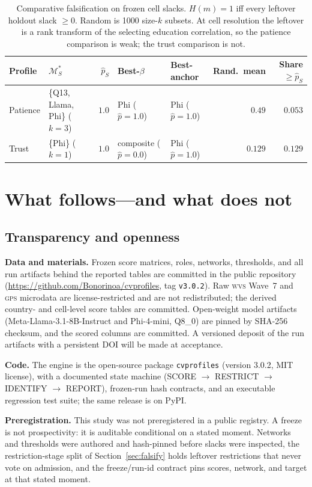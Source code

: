 \documentclass[10pt,letterpaper]{article}
\newcommand{\GPS}{\textsc{gps}}
\newcommand{\WVS}{\textsc{wvs}}
\newcommand{\cvp}{\texttt{cvprofiles}}
\newcommand{\M}{\ensuremath{\mathcal{M}}}
\begin{document}
\begin{table}[ht]
\centering
\small
\caption{Comparative falsification on frozen cell slacks.
$H(m)=1$ iff every leftover holdout slack $\ge 0$.
Random is 1000 size-$k$ subsets.
At cell resolution the leftover is a rank transform of the selecting education correlation, so the patience comparison is weak; the trust comparison is not.}
\label{tab:falsify}
\begin{tabular}{@{}l l r l l r r@{}}
\toprule
Profile & $\M^*_S$ & $\hat p_S$ & Best-$\beta$ & Best-anchor & Rand.\ mean & Share $\ge\hat p_S$ \\
\midrule
Patience & \{Q13, Llama, Phi\} ($k{=}3$) & $1.0$ & Phi ($\hat p{=}1.0$) & Phi ($\hat p{=}1.0$) & $0.49$ & $0.053$ \\
Trust & \{Phi\} ($k{=}1$) & $1.0$ & composite ($\hat p{=}0.0$) & Phi ($\hat p{=}1.0$) & $0.129$ & $0.129$ \\
\bottomrule
\end{tabular}
\end{table}

\section{What follows---and what does not}
\label{sec:discussion}

\subsection{Transparency and openness}
\label{sec:transparency}
\textbf{Data and materials.}
Frozen score matrices, roles, networks, thresholds, and all run artifacts behind the reported tables are committed in the public repository (\url{https://github.com/Bonorinoa/cvprofiles}, tag \texttt{v3.0.2}).
Raw \WVS{} Wave~7 and \GPS{} microdata are license-restricted and are not redistributed; the derived country- and cell-level score tables are committed.
Open-weight model artifacts (Meta-Llama-3.1-8B-Instruct and Phi-4-mini, Q8\_0) are pinned by SHA-256 checksum, and the scored columns are committed.
A versioned deposit of the run artifacts with a persistent DOI will be made at acceptance.

\textbf{Code.}
The engine is the open-source package \cvp{} (version 3.0.2, MIT license), with a documented state machine (SCORE $\to$ RESTRICT $\to$ IDENTIFY $\to$ REPORT), frozen-run hash contracts, and an executable regression test suite; the same release is on PyPI.

\textbf{Preregistration.}
This study was not preregistered in a public registry.
A freeze is not prospectivity: it is auditable conditional on a stated moment.
Networks and thresholds were authored and hash-pinned before slacks were inspected, the restriction-stage split of Section~\ref{sec:falsify} holds leftover restrictions that never vote on admission, and the freeze/run-id contract pins scores, network, and target at that stated moment.
\end{document}
